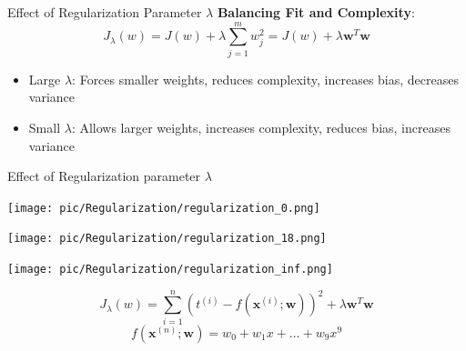 \documentclass[serif, aspectratio=169]{beamer}
\begin{document}
\begin{frame}{Effect of Regularization Parameter \( \lambda \)}
    \textbf{Balancing Fit and Complexity}:
    \[
    J_{\lambda}(w) = J(w) + \lambda \sum_{j=1}^{m} w_j^2 = J(w) + \lambda \mathbf{w}^T\mathbf{w}
    \]
    \begin{itemize}
        \item Large \( \lambda \): Forces smaller weights, reduces complexity, increases bias, decreases variance
        \item Small \( \lambda \): Allows larger weights, increases complexity, reduces bias, increases variance
    \end{itemize}
\end{frame}

\begin{frame}{Effect of Regularization parameter \( \lambda \)}
    \begin{minipage}{0.32\textwidth}
        \centering
        \texttt{[image: pic/Regularization/regularization\_0.png]}
    \end{minipage} %
    \begin{minipage}{0.32\textwidth}
        \centering
        \texttt{[image: pic/Regularization/regularization\_18.png]}
    \end{minipage} %
    \begin{minipage}{0.32\textwidth}
        \centering
        \texttt{[image: pic/Regularization/regularization\_inf.png]}
    \end{minipage}
    \vfill
    \[
    J_{\lambda}(w) = \sum_{i=1}^n \left( t^{(i)} - f(\mathbf{x}^{(i)}; \mathbf{w}) \right)^2 + \lambda \mathbf{w}^T\mathbf{w}
    \]
    \[
    f(\mathbf{x}^{(n)}; \mathbf{w}) = w_0 + w_1 x + \dots + w_9 x^9
    \]
    \vfill
\end{frame}
\end{document}
